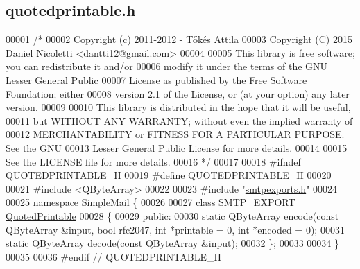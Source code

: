 \hypertarget{quotedprintable_8h_source}{}\subsection{quotedprintable.\+h}
\label{quotedprintable_8h_source}

\begin{DoxyCode}
00001 \textcolor{comment}{/*}
00002 \textcolor{comment}{  Copyright (c) 2011-2012 - Tőkés Attila}
00003 \textcolor{comment}{  Copyright (C) 2015 Daniel Nicoletti <dantti12@gmail.com>}
00004 \textcolor{comment}{}
00005 \textcolor{comment}{  This library is free software; you can redistribute it and/or}
00006 \textcolor{comment}{  modify it under the terms of the GNU Lesser General Public}
00007 \textcolor{comment}{  License as published by the Free Software Foundation; either}
00008 \textcolor{comment}{  version 2.1 of the License, or (at your option) any later version.}
00009 \textcolor{comment}{}
00010 \textcolor{comment}{  This library is distributed in the hope that it will be useful,}
00011 \textcolor{comment}{  but WITHOUT ANY WARRANTY; without even the implied warranty of}
00012 \textcolor{comment}{  MERCHANTABILITY or FITNESS FOR A PARTICULAR PURPOSE.  See the GNU}
00013 \textcolor{comment}{  Lesser General Public License for more details.}
00014 \textcolor{comment}{}
00015 \textcolor{comment}{  See the LICENSE file for more details.}
00016 \textcolor{comment}{*/}
00017 
00018 \textcolor{preprocessor}{#ifndef QUOTEDPRINTABLE\_H}
00019 \textcolor{preprocessor}{#define QUOTEDPRINTABLE\_H}
00020 
00021 \textcolor{preprocessor}{#include <QByteArray>}
00022 
00023 \textcolor{preprocessor}{#include "\hyperlink{smtpexports_8h}{smtpexports.h}"}
00024 
00025 \textcolor{keyword}{namespace }\hyperlink{namespace_simple_mail}{SimpleMail} \{
00026 
\hyperlink{class_simple_mail_1_1_quoted_printable}{00027} \textcolor{keyword}{class }\hyperlink{smtpexports_8h_ac580c9660cb24a34b13807f4eb0e1bd0}{SMTP\_EXPORT} \hyperlink{class_simple_mail_1_1_quoted_printable}{QuotedPrintable}
00028 \{
00029 \textcolor{keyword}{public}:
00030     \textcolor{keyword}{static} QByteArray encode(\textcolor{keyword}{const} QByteArray &input, \textcolor{keywordtype}{bool} rfc2047, \textcolor{keywordtype}{int} *printable = 0, \textcolor{keywordtype}{int} *encoded = 0);
00031     \textcolor{keyword}{static} QByteArray decode(\textcolor{keyword}{const} QByteArray &input);
00032 \};
00033 
00034 \}
00035 
00036 \textcolor{preprocessor}{#endif // QUOTEDPRINTABLE\_H}
\end{DoxyCode}
